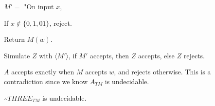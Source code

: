 \documentclass[11pt]{article}
\begin{document}
\hspace{30px}$M'=$ "On input $x$,

\hspace{45px}If $x\notin\{0,1,01\}$, reject.

\hspace{45px}Return $M(w)$.

\hspace{30px}Simulate $Z$ with $\langle M'\rangle$, if $M'$ accepts, then $Z$
accepts, else $Z$ rejects.

\vspace{5px}$A$ accepts exactly when $M$ accepts $w$, and rejects otherwise.
This is a contradiction since we know $A_{TM}$ is undecidable.

$\therefore THREE_{TM}$ is undecidable.

\pagebreak
\end{document}
